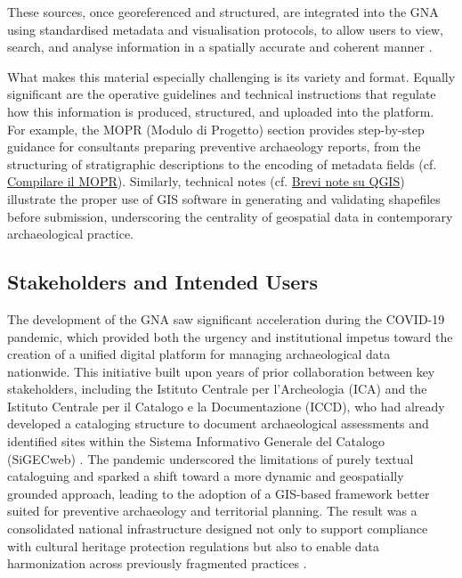 \begin{spacing}{1.5}
\noindent These sources, once georeferenced and structured, are integrated into the GNA using standardised metadata and visualisation protocols, to allow users to view, search, and analyse information in a spatially accurate and coherent manner \citep{boi_il_2023, acconcia_pubblicazione_2023}.

What makes this material especially challenging is its variety and format. Equally significant are the operative guidelines and technical instructions that regulate how this information is produced, structured, and uploaded into the platform. For example, the MOPR (Modulo di Progetto) section provides step-by-step guidance for consultants preparing preventive archaeology reports, from the structuring of stratigraphic descriptions to the encoding of metadata fields (cf. \href{https://gna.cultura.gov.it/wiki/index.php/Compilare_il_MOPR}{Compilare il MOPR}). Similarly, technical notes (cf. \href{https://gna.cultura.gov.it/wiki/index.php/Brevi_note_su_QGIS}{Brevi note su QGIS}) illustrate the proper use of GIS software in generating and validating shapefiles before submission, underscoring the centrality of geospatial data in contemporary archaeological practice.

\subsection{Stakeholders and Intended Users}\label{sec:gna_plugin}
The development of the GNA saw significant acceleration during the COVID-19 pandemic, which provided both the urgency and institutional impetus toward the creation of a unified digital platform for managing archaeological data nationwide. This initiative built upon years of prior collaboration between key stakeholders, including the Istituto Centrale per l’Archeologia (ICA) and the Istituto Centrale per il Catalogo e la Documentazione (ICCD), who had already developed a cataloging structure to document archaeological assessments and identified sites within the Sistema Informativo Generale del Catalogo (SiGECweb) \citep{calandra_il_2023, boi_il_2023}. The pandemic underscored the limitations of purely textual cataloguing and sparked a shift toward a more dynamic and geospatially grounded approach, leading to the adoption of a GIS-based framework better suited for preventive archaeology and territorial planning. The result was a consolidated national infrastructure designed not only to support compliance with cultural heritage protection regulations but also to enable data harmonization across previously fragmented practices \citep{acconcia_pubblicazione_2023}.


\end{spacing}
